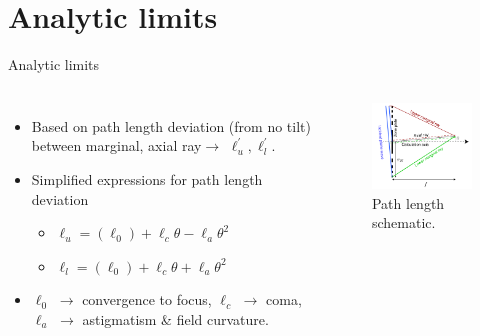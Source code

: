 \documentclass{beamer}
\def\ellexactu{\ell_{u}^{\prime}}
\def\ellexactl{\ell_{l}^{\prime}}
\def\ellapproxu{\ell_{u}}
\def\ellapproxl{\ell_{l}}
\def\ellapprox0{\ell_{0}}
\def\ellapproxc{\ell_{c}}
\def\ellapproxa{\ell_{a}}
\def\ellexactu{\ell_{u}^{\prime}}
\def\ellexactl{\ell_{l}^{\prime}}
\def\ellapproxu{\ell_{u}}
\def\ellapproxl{\ell_{l}}
\def\ellapprox0{\ell_{0}}
\def\ellapproxc{\ell_{c}}
\def\ellapproxa{\ell_{a}}
\begin{document}
\section{Analytic limits}
\begin{frame}{Analytic limits}
	\begin{block}{}
		\begin{columns}[onlytextwidth,T]
			\column{\dimexpr\linewidth-30mm-10mm}
			\begin{itemize}
				\item Based on path length deviation (from no tilt) between marginal, axial ray\footnotemark $\rightarrow$ $\ellexactu,\ellexactl$.
				\item Simplified expressions for path length deviation 
			   \begin{itemize}
					\item $\ellapproxu = (\ellapprox0) + \ellapproxc \theta-\ellapproxa
					\theta^{2}$
					\item $\ellapproxl = (\ellapprox0) + \ellapproxc \theta+\ellapproxa
					\theta^{2}$
				\end{itemize}
			\item $\ellapprox0$ $\rightarrow$ convergence to focus, $\ellapproxc$ $\rightarrow$ coma, $\ellapproxa$ $\rightarrow$
			astigmatism \& field curvature\footnotemark.
			\end{itemize}
			\column{30mm}
			\begin{figure}
				\hspace*{-1cm}\includegraphics[width=50mm]{zp_schematic}
				\caption{Path length schematic.}
			\end{figure}
		\end{columns}
	\addtocounter{footnote}{-1}
	\end{block}
\end{frame}
\end{document}
